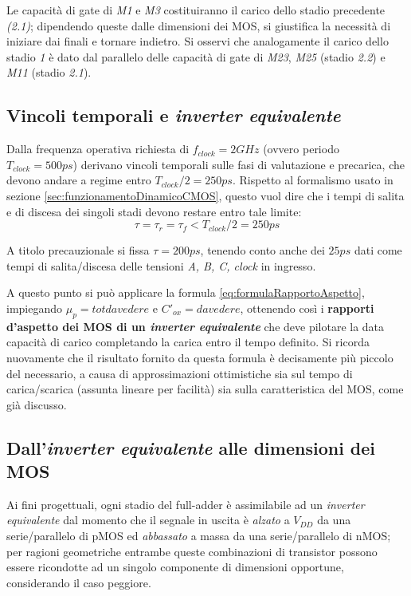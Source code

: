 Le capacità di gate di \textit{M1} e \textit{M3} costituiranno il carico dello stadio precedente \textit{(2.1)}; dipendendo queste dalle dimensioni dei MOS, si giustifica la necessità di iniziare dai finali e tornare indietro.
Si osservi che analogamente il carico dello stadio \textit{1} è dato dal parallelo delle capacità di gate di \textit{M23}, \textit{M25} (stadio \textit{2.2}) e \textit{M11} (stadio \textit{2.1}).

\subsection{Vincoli temporali e \textit{inverter equivalente}}
\label{subsec:specifiche}
Dalla frequenza operativa richiesta di $f_{clock} = 2GHz$ (ovvero periodo $T_{clock} = 500ps$) derivano vincoli temporali sulle fasi di valutazione e precarica, che devono andare a regime entro $T_{clock}/2 = 250ps$. Rispetto al formalismo usato in sezione \ref{sec:funzionamentoDinamicoCMOS}, questo vuol dire che i tempi di salita e di discesa dei singoli stadi devono restare entro tale limite: 
\begin{equation}
	\tau = \tau_{r} = \tau_{f} < T_{clock}/2 = 250ps
\end{equation}

A titolo precauzionale si fissa $\tau = 200ps$, tenendo conto anche dei $25ps$ dati come tempi di salita/discesa delle tensioni \textit{A, B, C, clock} in ingresso.

A questo punto si può applicare la formula \ref{eq:formulaRapportoAspetto}, impiegando $\mu_p = totdavedere$ e $C'_{ox} = davedere$, ottenendo così i \textbf{rapporti d'aspetto dei MOS di un \textit{inverter equivalente}} che deve pilotare la data capacità di carico completando la carica entro il tempo definito. Si ricorda nuovamente che il risultato fornito da questa formula è decisamente più piccolo del necessario, a causa di approssimazioni ottimistiche sia sul tempo di carica/scarica (assunta lineare per facilità) sia sulla caratteristica del MOS, come già discusso.

\subsection{Dall'\textit{inverter equivalente} alle dimensioni dei MOS}
\label{subsec:daInverterAMOS}
Ai fini progettuali, ogni stadio del full-adder è assimilabile ad un \textit{inverter equivalente} dal momento che il segnale in uscita è \textit{alzato} a $V_{DD}$ da una serie/parallelo di pMOS ed \textit{abbassato} a massa da una serie/parallelo di nMOS; per ragioni geometriche entrambe queste combinazioni di transistor possono essere ricondotte ad un singolo componente di dimensioni opportune, considerando il caso peggiore.

